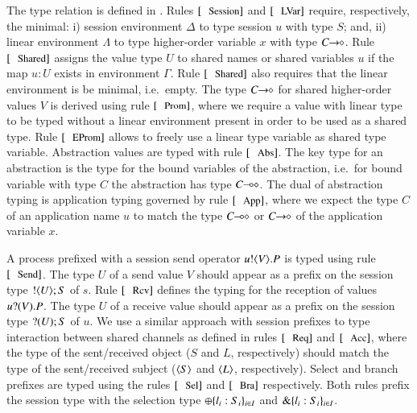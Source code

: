 

The type relation is defined in .
Rules $\trule{Session}$ and $\trule{LVar}$ require,
respectively, the minimal:
i) session environment $\Delta$ to type session 
$u$ with type $S$; and,
ii) linear environment $\Lambda$ to type 
higher-order variable $x$ with type $C\!\! \rightarrow\!\! \diamond$.
Rule $\trule{Shared}$
assigns the value type $U$
to shared names or shared variables $u$ 
if the map $u:U$ exists in environment
$\Gamma$. Rule $\trule{Shared}$ also requires 
that the linear environment is
be minimal, i.e.~empty.
The type $C\!\! \rightarrow\!\! \diamond$ for shared higher-order values $V$
is derived using rule $\trule{Prom}$, where we require
a value with linear type to be typed without a linear
environment present in order to be used as a shared type.
Rule $\trule{EProm}$ allows to freely use a linear
type variable as shared type variable. 
Abstraction values are typed with rule $\trule{Abs}$.
The key type for an abstraction is the type for
the bound variables of the abstraction, i.e.~for
bound variable with type $C$ the abstraction
has type $C\!\! \multimap\!\! \diamond$.
The dual of abstraction typing is application typing
governed by rule $\trule{App}$, where we expect
the type $C$ of an application name $u$ 
to match the type $C\!\! \multimap\!\! \diamond$ or $C\!\! \rightarrow\!\! \diamond$
of the application variable $x$.

A process prefixed with a session send operator $u ! \langle V \rangle . P$
is typed using rule $\trule{Send}$.
The type $U$ of a send value $V$ should appear as a prefix
on the session type $! \langle U \rangle ; S$ of $s$.
Rule $\trule{Rcv}$
defines the typing for the 
reception of values $u ? (V) . P$.
The type $U$ of a receive value should 
appear as a prefix on the session type $? (U) ; S$ of $u$.
We use a similar approach with session prefixes
to type interaction between shared channels as defined 
in rules $\trule{Req}$ and $\trule{Acc}$,
where the type of the sent/received object 
($S$ and $L$, respectively) should
match the type of the sent/received subject
($\langle S \rangle$ and $\langle L \rangle$, respectively).
Select and branch prefixes are typed using the rules
$\trule{Sel}$ and $\trule{Bra}$ respectively. Both
rules prefix the session type with the selection
type $\oplus \{l_i: S_i\}_{i \in I}$ and
$\& \{l_i:S_i\}_{i \in I}$.

